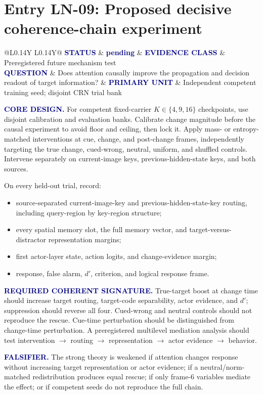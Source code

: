 \documentclass[11pt]{article}
\makeatletter
\newcommand{\statuspending}{\colorbox{PaleBlue}{\textcolor{Navy}{\sffamily\bfseries pending}}}
\newcommand{\smallcapslabel}[1]{\textcolor{Navy}{\sffamily\bfseries\footnotesize\MakeUppercase{#1}}}
\newcommand{\entrymeta}[4]{%
  \noindent\begin{tabularx}{\linewidth}{@{}L{0.14\linewidth}Y L{0.14\linewidth}Y@{}}
  \toprule
  \smallcapslabel{Status} & #1 & \smallcapslabel{Evidence class} & #2\\
  \smallcapslabel{Question} & #3 & \smallcapslabel{Primary unit} & #4\\
  \bottomrule
  \end{tabularx}
}
\makeatother
\begin{document}
\clearpage
\section{Entry LN-09: Proposed decisive coherence-chain experiment}
\entrymeta{\statuspending}{Preregistered future mechanism test}{Does attention causally improve the propagation and decision readout of target information?}{Independent competent training seed; disjoint CRN trial bank}

\smallcapslabel{Core design.}
For competent fixed-carrier $K\in\{4,9,16\}$ checkpoints, use disjoint calibration and evaluation banks. Calibrate change magnitude before the causal experiment to avoid floor and ceiling, then lock it. Apply mass- or entropy-matched interventions at cue, change, and post-change frames, independently targeting the true change, cued-wrong, neutral, uniform, and shuffled controls. Intervene separately on current-image keys, previous-hidden-state keys, and both sources.

On every held-out trial, record:
\begin{itemize}
\item source-separated current-image-key and previous-hidden-state-key routing, including query-region by key-region structure;
\item every spatial memory slot, the full memory vector, and target-versus-distractor representation margins;
\item first actor-layer state, action logits, and change-evidence margin;
\item response, false alarm, $d'$, criterion, and logical response frame.
\end{itemize}

\smallcapslabel{Required coherent signature.}
True-target boost at change time should increase target routing, target-code separability, actor evidence, and $d'$; suppression should reverse all four. Cued-wrong and neutral controls should not reproduce the rescue. Cue-time perturbation should be distinguished from change-time perturbation. A preregistered multilevel mediation analysis should test intervention $\rightarrow$ routing $\rightarrow$ representation $\rightarrow$ actor evidence $\rightarrow$ behavior.

\smallcapslabel{Falsifier.}
The strong theory is weakened if attention changes response without increasing target representation or actor evidence; if a neutral/norm-matched redistribution produces equal rescue; if only frame-6 variables mediate the effect; or if competent seeds do not reproduce the full chain.
\end{document}
